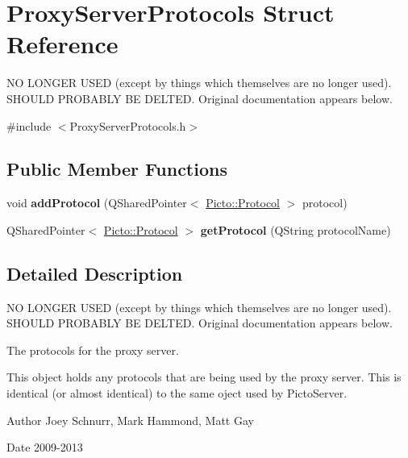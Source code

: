 \hypertarget{struct_proxy_server_protocols}{\section{Proxy\-Server\-Protocols Struct Reference}
\label{struct_proxy_server_protocols}
}


N\-O L\-O\-N\-G\-E\-R U\-S\-E\-D (except by things which themselves are no longer used). S\-H\-O\-U\-L\-D P\-R\-O\-B\-A\-B\-L\-Y B\-E D\-E\-L\-T\-E\-D. Original documentation appears below.  




{\ttfamily \#include $<$Proxy\-Server\-Protocols.\-h$>$}

\subsection*{Public Member Functions}
\begin{DoxyCompactItemize}
\item 
\hypertarget{struct_proxy_server_protocols_a3ae1a5750c66b0f76618560544643cbc}{void {\bfseries add\-Protocol} (Q\-Shared\-Pointer$<$ \hyperlink{struct_picto_1_1_protocol}{Picto\-::\-Protocol} $>$ protocol)}\label{struct_proxy_server_protocols_a3ae1a5750c66b0f76618560544643cbc}

\item 
\hypertarget{struct_proxy_server_protocols_a04becdb838cdd6f11692cb231bdeecb8}{Q\-Shared\-Pointer$<$ \hyperlink{struct_picto_1_1_protocol}{Picto\-::\-Protocol} $>$ {\bfseries get\-Protocol} (Q\-String protocol\-Name)}\label{struct_proxy_server_protocols_a04becdb838cdd6f11692cb231bdeecb8}

\end{DoxyCompactItemize}


\subsection{Detailed Description}
N\-O L\-O\-N\-G\-E\-R U\-S\-E\-D (except by things which themselves are no longer used). S\-H\-O\-U\-L\-D P\-R\-O\-B\-A\-B\-L\-Y B\-E D\-E\-L\-T\-E\-D. Original documentation appears below. 

The protocols for the proxy server.

This object holds any protocols that are being used by the proxy server. This is identical (or almost identical) to the same oject used by Picto\-Server. \begin{DoxyAuthor}{Author}
Joey Schnurr, Mark Hammond, Matt Gay 
\end{DoxyAuthor}
\begin{DoxyDate}{Date}
2009-\/2013 
\end{DoxyDate}


